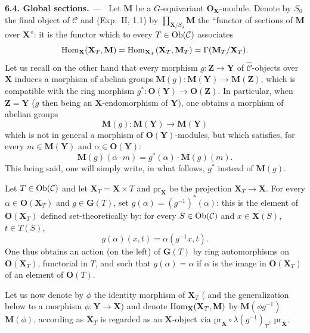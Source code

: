 \par{}
\noindent\textbf{6.4. Global sections.}\ ---\ \label{I.sec.6.4}
Let \(\mathbf{M}\) be a \(G\)-equivariant \(\mathbf{O}_{\mathbf{X}}\)-module.
Denote by \(S_{0}\) the final object of \(\mathcal{C}\) and (\cf Exp.~II, 1.1)
by \(\prod_{\mathbf{X}/S_{0}}\mathbf{M}\) the ``functor of sections of
\(\mathbf{M}\) over \(\mathbf{X}\)'': it is the functor which to every
\(T\in\operatorname{Ob}(\mathcal{C})\) associates
\[
\operatorname{Hom}_{\mathbf{X}}(\mathbf{X}_{T},\mathbf{M})
  =\operatorname{Hom}_{\mathbf{X}_{T}}(\mathbf{X}_{T},\mathbf{M}_{T})
  =\Gamma(\mathbf{M}_{T}/\mathbf{X}_{T}).
\]
Let us recall on the other hand that every morphism
\(g\colon\mathbf{Z}\to\mathbf{Y}\) of \(\widehat{\mathcal{C}}\)-objects over
\(\mathbf{X}\) induces a morphism of abelian groups
\(\mathbf{M}(g)\colon\mathbf{M}(\mathbf{Y})\to\mathbf{M}(\mathbf{Z})\), which is
compatible with the ring morphism
\(g^{*}\colon\mathbf{O}(\mathbf{Y})\to\mathbf{O}(\mathbf{Z})\). In particular,
when \(\mathbf{Z}=\mathbf{Y}\) (\(g\) then being an
\(\mathbf{X}\)-endomorphism of \(\mathbf{Y}\)), one obtains a morphism of
abelian groups
\[
\mathbf{M}(g)\colon\mathbf{M}(\mathbf{Y})\longrightarrow\mathbf{M}(\mathbf{Y})
\]
which is not in general a morphism of \(\mathbf{O}(\mathbf{Y})\)-modules, but
which satisfies, for every \(m\in\mathbf{M}(\mathbf{Y})\) and
\(\alpha\in\mathbf{O}(\mathbf{Y})\):
\[
\mathbf{M}(g)(\alpha\cdot m)=g^{*}(\alpha)\cdot\mathbf{M}(g)(m).
\]
This being said, one will simply write, in what follows, \(g^{*}\) instead of
\(\mathbf{M}(g)\).

Let \(T\in\operatorname{Ob}(\mathcal{C})\) and let \(\mathbf{X}_{T}=\mathbf{X}\times T\) and
\(\mathrm{pr}_{\mathbf{X}}\) be the projection
\(\mathbf{X}_{T}\to\mathbf{X}\). For every
\(\alpha\in\mathbf{O}(\mathbf{X}_{T})\) and \(g\in\mathbf{G}(T)\), set
\(g(\alpha)=(g^{-1})^{*}(\alpha)\): this is the element of
\(\mathbf{O}(\mathbf{X}_{T})\) defined set-theoretically by: for every
\(S\in\operatorname{Ob}(\mathcal{C})\) and \(x\in\mathbf{X}(S)\), \(t\in T(S)\),
\[
g(\alpha)(x,t)=\alpha(g^{-1}x,t).
\]
One thus obtains an action (on the left) of \(\mathbf{G}(T)\) by ring
automorphisms on \(\mathbf{O}(\mathbf{X}_{T})\), functorial in \(T\), and such
that \(g(\alpha)=\alpha\) if \(\alpha\) is the image in
\(\mathbf{O}(\mathbf{X}_{T})\) of an element of \(\mathbf{O}(T)\).

Let us now denote by \(\phi\) the identity morphism of \(\mathbf{X}_{T}\)
( and the generalization below to a morphism
\(\phi\colon\mathbf{Y}\to\mathbf{X}\)) and denote
\(\operatorname{Hom}_{\mathbf{X}}(\mathbf{X}_{T},\mathbf{M})\) by
\(\mathbf{M}(\phi g^{-1})\) \resp \(\mathbf{M}(\phi)\), according as
\(\mathbf{X}_{T}\) is regarded as an \(\mathbf{X}\)-object via
\(\mathrm{pr}_{\mathbf{X}}\circ\lambda(g^{-1})_{T}\), \resp
\(\mathrm{pr}_{\mathbf{X}}\).

